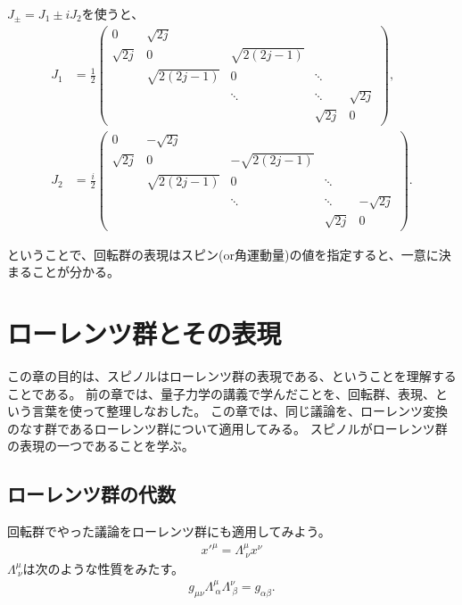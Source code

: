 \documentclass[10pt,a4paper]{jarticle}
\begin{document}
%
$J_\pm = J_1 \pm i J_2$を使うと、
\begin{align}
J_1 &= \frac{1}{2} \left(\begin{array}{ccccc}
0& \sqrt{2j} &&& \\
\sqrt{2j} &0& \sqrt{2(2j-1)} && \\
& \sqrt{2(2j-1)} &0& \ddots & \\
&& \ddots &\ddots& \sqrt{2j} \\
&&& \sqrt{2j} &0
\end{array}\right), \\
%
J_2 &= \frac{i}{2} \left(\begin{array}{ccccc}
0& -\sqrt{2j} &&& \\
\sqrt{2j} &0& -\sqrt{2(2j-1)} && \\
& \sqrt{2(2j-1)} &0& \ddots & \\
&& \ddots &\ddots& -\sqrt{2j} \\
&&& \sqrt{2j} &0
\end{array}\right).
\end{align}

ということで、回転群の表現はスピン(or角運動量)の値を指定すると、一意に決まることが分かる。



\section{ローレンツ群とその表現}
この章の目的は、スピノルはローレンツ群の表現である、ということを理解することである。
前の章では、量子力学の講義で学んだことを、回転群、表現、という言葉を使って整理しなおした。
この章では、同じ議論を、ローレンツ変換のなす群であるローレンツ群について適用してみる。
スピノルがローレンツ群の表現の一つであることを学ぶ。

\subsection{ローレンツ群の代数}
回転群でやった議論をローレンツ群にも適用してみよう。
\begin{align}
x'^\mu = \Lambda^\mu_{~\nu} x^\nu
\end{align}
$\Lambda^\mu_{~\nu}$は次のような性質をみたす。
\begin{align}
g_{\mu\nu} \Lambda^\mu_{~\alpha} \Lambda^\nu_{~\beta} = g_{\alpha\beta}.
\end{align}
\end{document}
